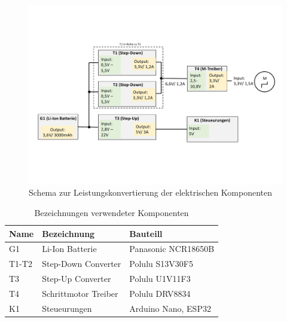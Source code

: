 \begin{figure}[h]
	\begin{center}
		\includegraphics[width=17cm]{leistungskonvertierung.pdf}
		\caption{Schema zur Leistungskonvertierung der elektrischen Komponenten}
		\label{pic:leistungskonvertierung}
	\end{center}
\end{figure}


\begin{table}[h]
	\begin{center}
		\begin{tabular}[h]{l|l|l}
			\textbf{Name} & \textbf{Bezeichnung} & \textbf{Bauteill}\\
			\hline
			G1 & Li-Ion Batterie & Panasonic NCR18650B\\
			\hline
			T1-T2 & Step-Down Converter & Polulu S13V30F5\\
			\hline
			T3 & Step-Up Converter & Polulu U1V11F3\\
			\hline
			T4 & Schrittmotor Treiber & Polulu DRV8834 \\
			\hline
			K1 & Steueurungen & Arduino Nano, ESP32 \\
		\end{tabular}
	\end{center}
	\caption{Bezeichnungen verwendeter Komponenten}
	\label{tbl:leistungskonvertierung}
\end{table}
\newpage

